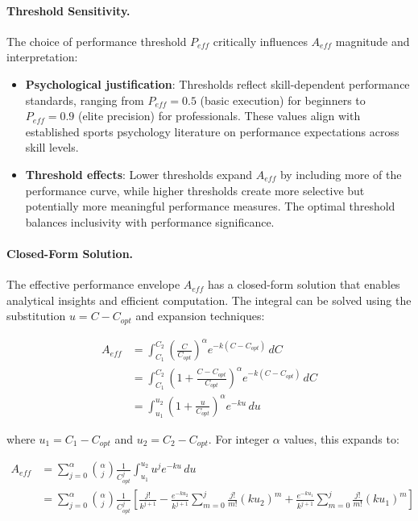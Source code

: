\documentclass{article}
\begin{document}
\paragraph{Threshold Sensitivity.} The choice of performance threshold $P_{eff}$ critically influences $A_{eff}$ 
magnitude and interpretation:
\begin{itemize}
    \item \textbf{Psychological justification}: Thresholds reflect skill-dependent performance standards, 
    ranging from $P_{eff} = 0.5$ (basic execution) for beginners to $P_{eff} = 0.9$ (elite precision) 
    for professionals. These values align with established sports psychology literature on performance 
    expectations across skill levels.
    
    \item \textbf{Threshold effects}: Lower thresholds expand $A_{eff}$ by including more of the performance 
    curve, while higher thresholds create more selective but potentially more meaningful performance measures. 
    The optimal threshold balances inclusivity with performance significance.
\end{itemize}

\paragraph{Closed-Form Solution.} The effective performance envelope $A_{eff}$ has a closed-form solution that enables
analytical insights and efficient computation. The integral can be solved using the substitution $u = C - C_{opt}$ and
expansion techniques:

\begin{align}
A_{eff} &= \int_{C_1}^{C_2} \left(\frac{C}{C_{opt}}\right)^{\alpha}e^{-k (C - C_{opt})} \, dC \\
&= \int_{C_1}^{C_2} \left(1 + \frac{C - C_{opt}}{C_{opt}}\right)^{\alpha}e^{-k (C - C_{opt})} \, dC \\
&= \int_{u_1}^{u_2} \left(1 + \frac{u}{C_{opt}}\right)^{\alpha}e^{-k u} \, du
\end{align}

where $u_1 = C_1 - C_{opt}$ and $u_2 = C_2 - C_{opt}$. For integer $\alpha$ values, this expands to:

\begin{align}
A_{eff} &= \sum_{j=0}^{\alpha} \binom{\alpha}{j} \frac{1}{C_{opt}^j} \int_{u_1}^{u_2} u^j e^{-k u} \, du \\
&= \sum_{j=0}^{\alpha} \binom{\alpha}{j} \frac{1}{C_{opt}^j} \left[\frac{j!}{k^{j+1}} - \frac{e^{-k u_2}}{k^{j+1}} \sum_{m=0}^j \frac{j!}{m!}(k u_2)^m + \frac{e^{-k u_1}}{k^{j+1}} \sum_{m=0}^j \frac{j!}{m!}(k u_1)^m \right]
\end{align}
\end{document}
